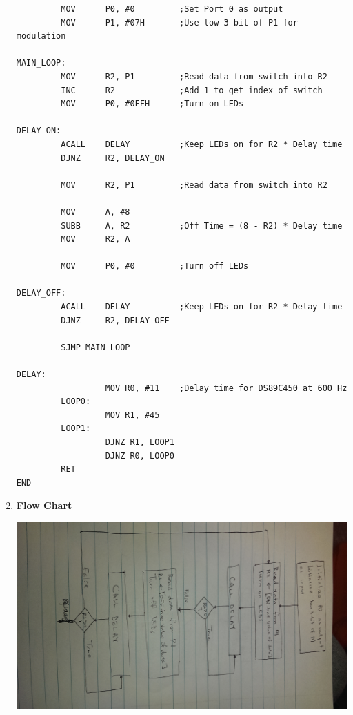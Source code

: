 \documentclass[9pt]{article}
\begin{document}
\begin{enumerate}
\begin{verbatim}
         MOV      P0, #0         ;Set Port 0 as output
         MOV      P1, #07H       ;Use low 3-bit of P1 for modulation

MAIN_LOOP:
         MOV      R2, P1         ;Read data from switch into R2
         INC      R2             ;Add 1 to get index of switch
         MOV      P0, #0FFH      ;Turn on LEDs

DELAY_ON:
         ACALL    DELAY          ;Keep LEDs on for R2 * Delay time
         DJNZ     R2, DELAY_ON
				
         MOV      R2, P1         ;Read data from switch into R2
			
         MOV      A, #8					
         SUBB     A, R2          ;Off Time = (8 - R2) * Delay time
         MOV      R2, A	
         
         MOV      P0, #0         ;Turn off LEDs
	
DELAY_OFF:
         ACALL    DELAY          ;Keep LEDs on for R2 * Delay time
         DJNZ     R2, DELAY_OFF	
			
         SJMP MAIN_LOOP						

DELAY:
                  MOV R0, #11    ;Delay time for DS89C450 at 600 Hz
         LOOP0:
                  MOV R1, #45    
         LOOP1:
                  DJNZ R1, LOOP1 
                  DJNZ R0, LOOP0
         RET
END
         \end{verbatim}
   \item \textbf{Flow Chart} \text{ } \\
                  \begin{center}
                     \includegraphics[angle=-90,width=\textwidth]{flowchart.jpg}
                  \end{center}
\end{enumerate}
\end{document}
